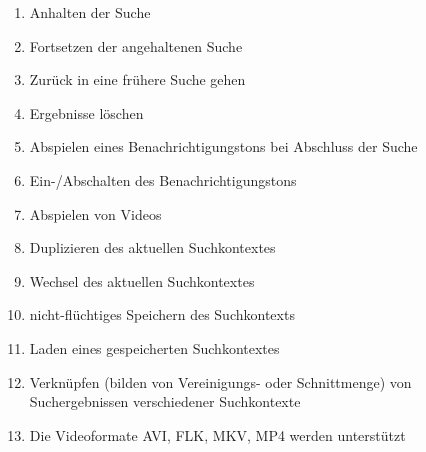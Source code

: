 \begin{enumerate} [label=\bfseries /F \arabic*0/]
	\subsection{Wunsch}
	\item Anhalten der Suche
	\item Fortsetzen der angehaltenen Suche
	\item Zurück in eine frühere Suche gehen
	\item Ergebnisse löschen
	\item Abspielen eines Benachrichtigungstons bei Abschluss der Suche
	\item Ein-/Abschalten des Benachrichtigungstons
	\item Abspielen von Videos
	\item Duplizieren des aktuellen Suchkontextes
	\item Wechsel des aktuellen Suchkontextes
	\item nicht-fl\"uchtiges Speichern des Suchkontexts
	\item Laden eines gespeicherten Suchkontextes
	\item Verkn\"upfen (bilden von Vereinigungs- oder Schnittmenge) von Suchergebnissen verschiedener Suchkontexte
	\item Die Videoformate AVI, FLK, MKV, MP4 werden unterst\"utzt
\end{enumerate}
